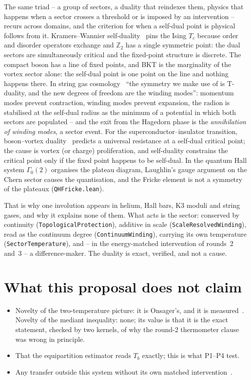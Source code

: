 \documentclass[11pt,a4paper]{article}
\newcommand{\lean}[1]{\texttt{\small #1}}
\begin{document}
The same triad -- a group of sectors, a duality that reindexes them, physics that happens when a sector crosses a
threshold or is imposed by an intervention -- recurs across domains, and the criterion for when a self-dual point
is physical follows from it. Kramers--Wannier self-duality~\cite{KramersWannier1941} pins the Ising $T_c$ because order and disorder
operators exchange and $\mathbb Z_2$ has a single symmetric point: the dual sectors are simultaneously critical and
the fixed-point structure is discrete. The compact boson has a line of fixed points, and BKT is the marginality of
the vortex sector alone: the self-dual point is one point on the line and nothing happens there. In string gas
cosmology~\cite{BrandenbergerVafa1989,Brandenberger2008} ``the symmetry we make use of is T-duality, and the new
degrees of freedom are the winding modes'': momentum modes prevent contraction, winding modes prevent expansion, the
radion is stabilised at the self-dual radius as the minimum of a potential in which both sectors are populated --
and the exit from the Hagedorn phase is the \emph{annihilation of winding modes}, a sector event. For the
superconductor--insulator transition, boson--vortex duality~\cite{FisherLee1989,Fisher1990} predicts a universal
resistance at a self-dual critical point; the cause is vortex (or charge) proliferation, and self-duality
constrains the critical point only if the fixed point happens to be self-dual. In the quantum Hall system
$\Gamma_0(2)$ organises the plateau diagram, Laughlin's gauge argument on the Chern sector causes the
quantisation, and the Fricke element is not a symmetry of the plateaux (\lean{QHFricke.lean}).

That is why one involution appears in helium, Hall bars, K3 moduli and string gases, and why it explains none of
them. What acts is the sector: conserved by continuity (\lean{TopologicalProtection}), additive in scale
(\lean{ScaleResolvedWinding}), read as the continuum degree (\lean{ContinuumWinding}), carrying its own
temperature (\lean{SectorTemperature}), and -- in the energy-matched intervention of rounds~2 and~3 -- a
difference-maker. The duality is exact, verified, and not a cause.

\section{What this proposal does not claim}
\begin{failbox}
\begin{itemize}[leftmargin=*]
\item Novelty of the two-temperature picture: it is Onsager's, and it is measured~\cite{Gauthier2019,
  Johnstone2019,Groszek2018}. Novelty of the mediant inequality: none; its value is that it is the
  exact statement, checked by two kernels, of why the round-2 thermometer clause was wrong in principle.
\item That the equipartition estimator reads $T_b$ exactly; this is what P1--P4 test.
\item Any transfer outside this system without its own matched intervention~\cite{Callens2026Astro}.
\end{itemize}
\end{failbox}



\end{document}
